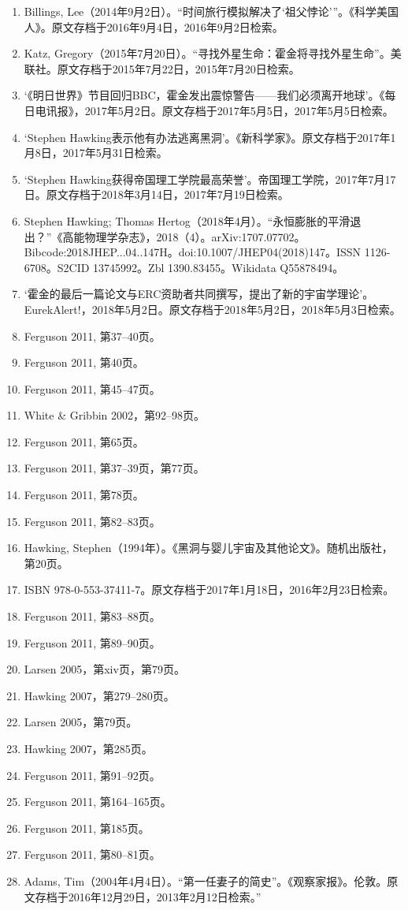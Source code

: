 \begin{enumerate}
\item Billings, Lee（2014年9月2日）。“时间旅行模拟解决了‘祖父悖论’”。《科学美国人》。原文存档于2016年9月4日，2016年9月2日检索。  
\item Katz, Gregory（2015年7月20日）。“寻找外星生命：霍金将寻找外星生命”。美联社。原文存档于2015年7月22日，2015年7月20日检索。  
\item ‘《明日世界》节目回归BBC，霍金发出震惊警告——我们必须离开地球’。《每日电讯报》，2017年5月2日。原文存档于2017年5月5日，2017年5月5日检索。  
\item ‘Stephen Hawking表示他有办法逃离黑洞’。《新科学家》。原文存档于2017年1月8日，2017年5月31日检索。  
\item ‘Stephen Hawking获得帝国理工学院最高荣誉’。帝国理工学院，2017年7月17日。原文存档于2018年3月14日，2017年7月19日检索。  
\item Stephen Hawking; Thomas Hertog（2018年4月）。“永恒膨胀的平滑退出？”《高能物理学杂志》，2018（4）。arXiv:1707.07702。Bibcode:2018JHEP...04..147H。doi:10.1007/JHEP04(2018)147。ISSN 1126-6708。S2CID 13745992。Zbl 1390.83455。Wikidata Q55878494。  
\item ‘霍金的最后一篇论文与ERC资助者共同撰写，提出了新的宇宙学理论’。EurekAlert!，2018年5月2日。原文存档于2018年5月2日，2018年5月3日检索。  
\item Ferguson 2011, 第37–40页。  
\item Ferguson 2011, 第40页。  
\item Ferguson 2011, 第45–47页。  
\item White & Gribbin 2002，第92–98页。  
\item Ferguson 2011, 第65页。  
\item Ferguson 2011, 第37–39页，第77页。  
\item Ferguson 2011, 第78页。  
\item Ferguson 2011, 第82–83页。  
\item Hawking, Stephen（1994年）。《黑洞与婴儿宇宙及其他论文》。随机出版社，第20页。\item ISBN 978-0-553-37411-7。原文存档于2017年1月18日，2016年2月23日检索。  
\item Ferguson 2011, 第83–88页。  
\item Ferguson 2011, 第89–90页。  
\item Larsen 2005，第xiv页，第79页。  
\item Hawking 2007，第279–280页。  
\item Larsen 2005，第79页。  
\item Hawking 2007，第285页。  
\item Ferguson 2011, 第91–92页。  
\item Ferguson 2011, 第164–165页。  
\item Ferguson 2011, 第185页。  
\item Ferguson 2011, 第80–81页。  
\item Adams, Tim（2004年4月4日）。“第一任妻子的简史”。《观察家报》。伦敦。原文存档于2016年12月29日，2013年2月12日检索。”
\end{enumerate}